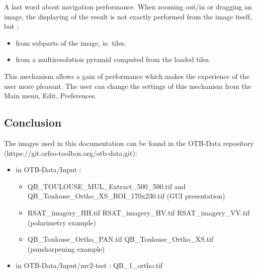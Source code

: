 A last word about navigation performance. When zooming out/in or dragging an image, 
the displaying of the result is not exactly performed from the image itself, but :
\begin{itemize}
\item from subparts of the image, ie. tiles.
\item from a multiresolution pyramid computed from the loaded tiles.
\end{itemize}
This mechanism allows a gain of performance which makes the experience of the user more pleasant.
The user can change the settings of this mechanism from the Main menu, Edit, Preferences.

\subsection{Conclusion}\label{ssec:moncon}
The images used in this documentation can be found in the OTB-Data repository (https://git.orfeo-toolbox.org/otb-data.git):
\begin{itemize}
\item in OTB-Data/Input : 
\begin{itemize}
\item QB\_TOULOUSE\_MUL\_Extract\_500\_500.tif and QB\_Toulouse\_Ortho\_XS\_ROI\_170x230.tif (GUI presentation)
\item RSAT\_imagery\_HH.tif RSAT\_imagery\_HV.tif RSAT\_imagery\_VV.tif (polarimetry example)
\item QB\_Toulouse\_Ortho\_PAN.tif QB\_Toulouse\_Ortho\_XS.tif (pansharpening example)
\end{itemize}

\item in OTB-Data/Input/mv2-test : QB\_1\_ortho.tif
\end{itemize}
